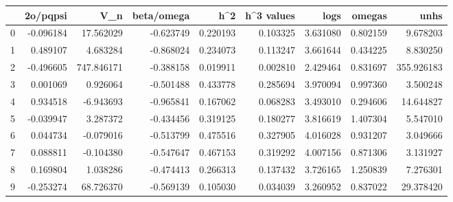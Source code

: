 \begin{tabular}{lrrrrrrrr}
\toprule
{} &  2o/pqpsi &         V\_n &  beta/omega &       h\textasciicircum2 &  h\textasciicircum3 values &      logs &    omegas &        unhs \\
\midrule
0 &           -0.096184 &   17.562029 &   -0.623749 &  0.220193 &    0.103325 &  3.631080 &  0.802159 &    9.678203 \\
1 &            0.489107 &    4.683284 &   -0.868024 &  0.234073 &    0.113247 &  3.661644 &  0.434225 &    8.830250 \\
2 &           -0.496605 &  747.846171 &   -0.388158 &  0.019911 &    0.002810 &  2.429464 &  0.831697 &  355.926183 \\
3 &            0.001069 &    0.926064 &   -0.501488 &  0.433778 &    0.285694 &  3.970094 &  0.997360 &    3.500248 \\
4 &            0.934518 &   -6.943693 &   -0.965841 &  0.167062 &    0.068283 &  3.493010 &  0.294606 &   14.644827 \\
5 &           -0.039947 &    3.287372 &   -0.434456 &  0.319125 &    0.180277 &  3.816619 &  1.407304 &    5.547010 \\
6 &            0.044734 &   -0.079016 &   -0.513799 &  0.475516 &    0.327905 &  4.016028 &  0.931207 &    3.049666 \\
7 &            0.088811 &   -0.104380 &   -0.547647 &  0.467153 &    0.319292 &  4.007156 &  0.871306 &    3.131927 \\
8 &            0.169804 &    1.038286 &   -0.474413 &  0.266313 &    0.137432 &  3.726165 &  1.250839 &    7.276301 \\
9 &           -0.253274 &   68.726370 &   -0.569139 &  0.105030 &    0.034039 &  3.260952 &  0.837022 &   29.378420 \\
\bottomrule
\end{tabular}


